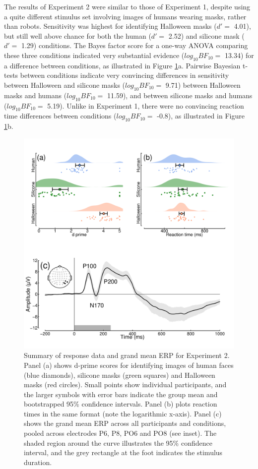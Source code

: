 \documentclass[
]{article}
\begin{document}
The results of Experiment 2 were similar to those of Experiment 1, despite using a quite different stimulus set involving images of humans wearing masks, rather than robots. Sensitivity was highest for identifying Halloween masks (\(d' =\) 4.01), but still well above chance for both the human (\(d' =\) 2.52) and silicone mask (\(d' =\) 1.29) conditions. The Bayes factor score for a one-way ANOVA comparing these three conditions indicated very substantial evidence (\(log_{10}BF_{10} =\) 13.34) for a difference between conditions, as illustrated in Figure \ref{fig:MasksData}a. Pairwise Bayesian t-tests between conditions indicate very convincing differences in sensitivity between Halloween and silicone masks (\(log_{10}BF_{10} =\) 9.71) between Halloween masks and humans (\(log_{10}BF_{10} =\) 11.59), and between silicone masks and humans (\(log_{10}BF_{10} =\) 5.19). Unlike in Experiment 1, there were no convincing reaction time differences between conditions (\(log_{10}BF_{10} =\) -0.8), as illustrated in Figure \ref{fig:MasksData}b.

\begin{figure}

{\centering \includegraphics{Figures/MasksData} 

}

\caption{Summary of response data and grand mean ERP for Experiment 2. Panel (a) shows d-prime scores for identifying images of human faces (blue diamonds), silicone masks (green squares) and Halloween masks (red circles). Small points show individual participants, and the larger symbols with error bars indicate the group mean and bootstrapped 95\% confidence intervals. Panel (b) plots reaction times in the same format (note the logarithmic x-axis). Panel (c) shows the grand mean ERP across all participants and conditions, pooled across electrodes P6, P8, PO6 and PO8 (see inset). The shaded region around the curve illustrates the 95\% confidence interval, and the grey rectangle at the foot indicates the stimulus duration.}\label{fig:MasksData}
\end{figure}
\end{document}
